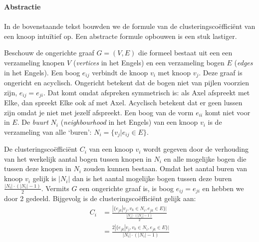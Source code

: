 \begin{kader}
\noindent\textbf{Abstractie}\\
\ \\
\noindent In de bovenstaande tekst bouwden we de formule van de clusteringscoëfficiënt van een knoop intuïtief op. Een abstracte formule opbouwen is een stuk lastiger. 

Beschouw de ongerichte graaf $G = (V, E)$ die formeel bestaat uit een een verzameling knopen $V$ (\textit{vertices} in het Engels) en een verzameling bogen $E$ (\textit{edges} in het Engels). Een boog $e_{ij}$ verbindt de knoop $v_i$ met knoop $v_j$. Deze graaf is ongericht en acyclisch. Ongericht betekent dat de bogen niet van pijlen voorzien zijn, $e_{ij} = e_{ji}$. Dat komt omdat afspreken symmetrisch is: als Axel afspreekt met Elke, dan spreekt Elke ook af met Axel. Acyclisch betekent dat er geen lussen zijn omdat je niet met jezelf afspreekt. Een boog van de vorm $e_{ii}$ komt niet voor in $E$. De \textit{buurt} $N_i$ (\textit{neighbourhood} in het Engels) van een knoop $v_i$ is de verzameling van alle `buren': $N_i = \{v_j | e_{ij} \in E\}.$

De clusteringscoëfficiënt $C_i$ van een knoop $v_i$ wordt gegeven door de verhouding van het werkelijk aantal bogen tussen knopen in $N_i$ en alle mogelijke bogen die tussen deze knopen in $N_i$ zouden kunnen bestaan. Omdat het aantal buren van knoop $v_i$ gelijk is $|N_i|$ dan is het aantal mogelijke bogen tussen deze buren $\frac{|N_i|\cdot\left(|N_i|-1\right)}{2}$. Vermits $G$ een ongerichte graaf is, is boog $e_{ij} = e_{ji}$ en hebben we door 2 gedeeld. Bijgevolg is de clusteringscoëfficiënt gelijk aan:
\begin{align*}
C_i &= \frac{|\{e_{jk} | v_j, v_k \in N_i, e_{jk} \in E\}|}{\frac{|N_i|\cdot\left(|N_i|-1\right)}{2}}\\
&= \frac{2|\{e_{jk} | v_j, v_k \in N_i, e_{jk} \in E\}|}{|N_i|\cdot\left(|N_i|-1\right)}
\end{align*}
\end{kader}


